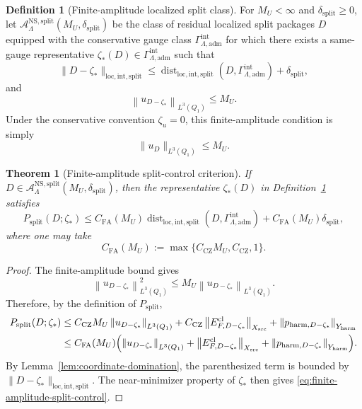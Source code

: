 \documentclass[11pt]{article}
\numberwithin{equation}{section}
\newtheorem{theorem}{Theorem}[section]
\theoremstyle{definition}
\newtheorem{definition}[definition]{Definition}
\theoremstyle{remark}
\DeclareMathOperator{\dist}{dist}
\newcommand{\NS}{\mathrm{NS}}
\newcommand{\loc}{\mathrm{loc}}
\newcommand{\intg}{\mathrm{int}}
\newcommand{\spl}{\mathrm{split}}
\newcommand{\adm}{\mathrm{adm}}
\newcommand{\harm}{\mathrm{harm}}
\newcommand{\src}{\mathrm{src}}
\newcommand{\cl}{\mathrm{cl}}
\newcommand{\CZ}{\mathrm{CZ}}
\newcommand{\norm}[2]{\left\|#1\right\|_{#2}}
\newcommand{\calA}{\mathcal A}
\newcommand{\Gammaadm}{\Gamma^{\intg}_{\Lambda,\adm}}
\begin{document}
\begin{definition}[Finite-amplitude localized split class]\label{def:finite-amplitude-class}
For $M_U<\infty$ and $\delta_{\spl}\ge0$, let
$\calA^{\NS,\spl}_{\Lambda}(M_U,\delta_{\spl})$ be the class of residual localized split
packages $D$ equipped with the conservative gauge class $\Gammaadm$ for which there exists
a same-gauge representative $\zeta_*(D)\in\Gammaadm$ such that
\[
\|D-\zeta_*\|_{\loc,\intg,\spl}
\le
\dist_{\loc,\intg,\spl}(D,\Gammaadm)+\delta_{\spl},
\]
and
\[
        \norm{u_{D-\zeta_*}}{L^3(Q_1)}\le M_U.
\]
Under the conservative convention $\zeta_u=0$, this finite-amplitude condition is simply
\[
    \|u_D\|_{L^3(Q_1)}\le M_U.
\]
\end{definition}

\begin{theorem}[Finite-amplitude split-control criterion]\label{thm:finite-amplitude-split-control}
If $D\in\calA^{\NS,\spl}_{\Lambda}(M_U,\delta_{\spl})$, then the representative
$\zeta_*(D)$ in Definition~\ref{def:finite-amplitude-class} satisfies
\begin{equation}\label{eq:finite-amplitude-split-control}
P_{\spl}(D;\zeta_*)
\le
C_{\mathrm{FA}}(M_U)\dist_{\loc,\intg,\spl}(D,\Gammaadm)
+C_{\mathrm{FA}}(M_U)\delta_{\spl},
\end{equation}
where one may take
\[
        C_{\mathrm{FA}}(M_U):=\max\{C_{\CZ}M_U,C_{\CZ},1\}.
\]
\end{theorem}

\begin{proof}
The finite-amplitude bound gives
\[
        \norm{u_{D-\zeta_*}}{L^3(Q_1)}^2
        \le
        M_U\norm{u_{D-\zeta_*}}{L^3(Q_1)}.
\]
Therefore, by the definition of $P_{\spl}$,
\begin{align*}
P_{\spl}(D;\zeta_*)
&\le
C_{\CZ}M_U\norm{u_{D-\zeta_*}}{L^3(Q_1)}
+C_{\CZ}\norm{E^{\cl}_{F,D-\zeta_*}}{X_{\src}}
+
\norm{p_{\harm,D-\zeta_*}}{Y_{\harm}} \\
&\le
C_{\mathrm{FA}}(M_U)
\Bigl(
\norm{u_{D-\zeta_*}}{L^3(Q_1)}
+
\norm{E^{\cl}_{F,D-\zeta_*}}{X_{\src}}
+
\norm{p_{\harm,D-\zeta_*}}{Y_{\harm}}
\Bigr).
\end{align*}
By Lemma~\ref{lem:coordinate-domination}, the parenthesized term is bounded by
$\|D-\zeta_*\|_{\loc,\intg,\spl}$.  The near-minimizer property of $\zeta_*$ then gives
\eqref{eq:finite-amplitude-split-control}.
\end{proof}
\end{document}
